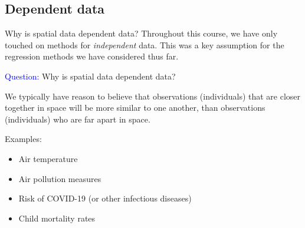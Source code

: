 \documentclass[10pt,t]{beamer}
\begin{document}
\subsection{Dependent data}

\begin{frame}{Why is spatial data dependent data?}
Throughout this course, we have only touched on methods for \textit{independent} data. This was a key assumption for the regression methods we have considered thus far.

\vspace{0.3cm}

\textcolor{blue}{Question:} Why is spatial data dependent data?

\vspace{0.3cm}

\pause We typically have reason to believe that observations (individuals) that are closer together in space will be more similar to one another, than observations (individuals) who are far apart in space.

\vspace{0.3cm}

\pause Examples:

\vspace{0.3cm}

\begin{itemize}
	\item Air temperature
	\item Air pollution measures
	\item Risk of COVID-19 (or other infectious diseases)
	\item Child mortality rates
\end{itemize} 

\end{frame}
\end{document}
